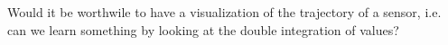 Would it be worthwile to have a visualization of the trajectory of a sensor, i.e. can we learn something by looking at the double integration of values?

